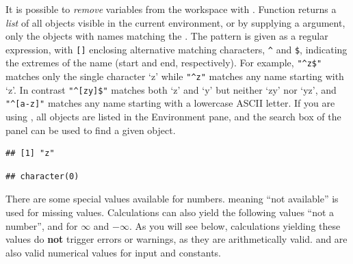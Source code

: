 \documentclass[krantz2]{krantz}\usepackage{knitr}
\begin{document}
It is possible to \emph{remove} variables from the workspace with . Function  returns a \emph{list} of all objects visible in the current environment, or by supplying a  argument, only the objects with names matching the . The pattern is given as a regular expression, with \verb|[]| enclosing alternative matching characters, \verb|^| and \verb|$|, indicating the extremes of the name (start and end, respectively). For example, \verb|"^z$"| matches only the single character `z' while \verb|"^z"| matches any name starting with `z'. In contrast \verb|"^[zy]$"| matches both `z' and `y' but neither `zy' nor `yz', and \verb|"^[a-z]"| matches any name starting with a lowercase ASCII letter. If you are using , all objects are listed in the Environment pane, and the search box of the panel can be used to find a given object.

\begin{knitrout}\footnotesize
{}\color{fgcolor}\begin{kframe}
\begin{alltt}
\hlstd{(}\hlstd{=}\hlstd{)}
\end{alltt}
\begin{verbatim}
## [1] "z"
\end{verbatim}
\begin{alltt}
\hlstd{(}\hlstd{=}\hlstd{)}
\end{alltt}
\begin{verbatim}
## character(0)
\end{verbatim}
\end{kframe}
\end{knitrout}

There\label{par:special:values} are some special values available for numbers.  meaning ``not available'' is used for missing values. Calculations can also yield the following values  ``not a number'',  and  for $\infty$ and $-\infty$. As you will see below, calculations yielding these values do \textbf{not} trigger errors or warnings, as they are arithmetically valid.  and  are also valid numerical values for input and constants.
\end{document}
